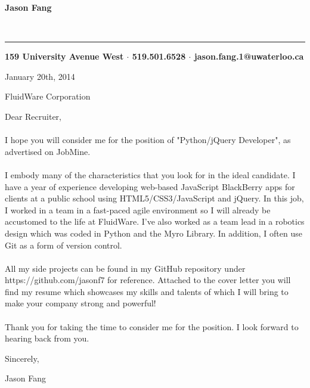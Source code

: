 \documentclass[12pt]{article}
\begin{document}
\pagestyle{empty}
\setlength{\parindent}{10cm}

\begin{center}
\begin{huge}\textbf{Jason Fang}\end{huge}\\
\rule{475pt}{1pt}
\textbf{159 University Avenue West $\cdot$ 519.501.6528 $\cdot$ jason.fang.1@uwaterloo.ca} 
\end{center}


\setlength{\parindent}{0pt}

\vspace{24pt}January 20th, 2014 

FluidWare Corporation

Dear Recruiter,

\paragraph*{}\hspace{10pt}I hope you will consider me for the position of "Python/jQuery Developer", as advertised on JobMine.

\paragraph*{}\hspace{10pt}I embody many of the characteristics that you look for in the ideal candidate. I have a year of experience developing web-based JavaScript BlackBerry apps for clients at a public school using HTML5/CSS3/JavaScript and jQuery. In this job, I worked in a team in a fast-paced agile environment so I will already be accustomed to the life at FluidWare. I've also worked as a team lead in a robotics design which was coded in Python and the Myro Library. In addition, I often use Git as a form of version control.

\paragraph*{}\hspace{10pt}All my side projects can be found in my GitHub repository under https://github.com/jasonf7 for reference. Attached to the cover letter you will find my resume which showcases my skills and talents of which I will bring to make your company strong and powerful!

\paragraph*{}\hspace{10pt}Thank you for taking the time to consider me for the position. I look forward to hearing back from you.

\vspace{12pt}Sincerely,

\vspace{12pt}Jason Fang
\end{document}
